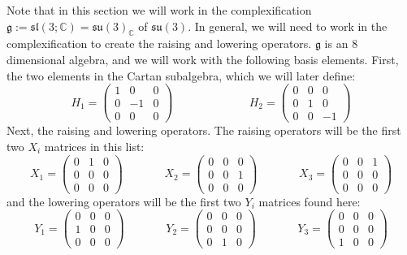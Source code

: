\documentclass[11pt, oneside]{article}   	%
\theoremstyle{definition}
\begin{document}
Note that in this section we will work in the complexification $\mathfrak g := \mathfrak{sl}(3; \mathbb C) = 
\mathfrak{su}(3)_\mathbb{C}$ of $\mathfrak{su}(3)$. In general, we will need to work in the complexification to create the 
raising and lowering operators. $\mathfrak{g}$ is an 8 dimensional algebra, and we will work with the following basis 
elements. First, the two elements in the Cartan subalgebra, which we will later define:
\begin{equation}
	H_1 = \begin{pmatrix} 1 & 0 & 0 \\ 0 & -1 & 0 \\ 0 & 0 & 0 \end{pmatrix} \;\;\;\;\;\;\;\;\;\;\;\;\;\;\;\;\;\;\;\;\;\;\;\;  H_2 = 
	\begin{pmatrix}0 & 0 & 0 \\ 0 & 1 & 0 \\ 0 & 0 & -1\end{pmatrix} 
\end{equation}
Next, the raising and lowering operators. The raising operators will be the first two $X_i$ matrices in this list:
\begin{equation}
	X_1 = \begin{pmatrix} 0 & 1 & 0 \\ 0 & 0 & 0 \\ 0 & 0 & 0 \end{pmatrix} \;\;\;\;\;\;\;\;\;\;\;\;\; X_2 = \begin{pmatrix} 0 & 0 & 0 \\ 
	0 & 0 & 1 \\ 0 & 0 & 0 \end{pmatrix} \;\;\;\;\;\;\;\;\;\;\;\;\; X_3 = \begin{pmatrix} 0 & 0 & 1 \\ 0 & 0 & 0 \\ 0 & 0 & 0 
	\end{pmatrix} 
\end{equation}
and the lowering operators will be the first two $Y_i$ matrices found here:
\begin{equation}
	Y_1 = \begin{pmatrix} 0 & 0 & 0 \\ 1 & 0 & 0 \\ 0 & 0 & 0 \end{pmatrix} \;\;\;\;\;\;\;\;\;\;\;\;\; Y_2 = \begin{pmatrix} 0 & 0 & 0 \\ 
	0 & 0 & 0 \\ 0 & 1 & 0 \end{pmatrix} \;\;\;\;\;\;\;\;\;\;\;\;\; Y_3 = \begin{pmatrix} 0 & 0 & 0 \\ 0 & 0 & 0 \\ 1 & 0 & 0 
	\end{pmatrix}
\end{equation}
\end{document}
